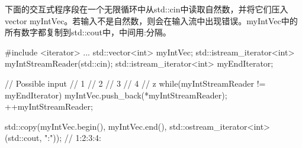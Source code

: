 下面的交互式程序段在一个无限循环中从std::cin中读取自然数，并将它们压入vector myIntVec。若输入不是自然数，则会在输入流中出现错误。myIntVec中的所有数字都复制到std::cout中，中间用:分隔。

\begin{cpp}
#include <iterator>
...
std::vector<int> myIntVec;
std::istream_iterator<int> myIntStreamReader(std::cin);
std::istream_iterator<int> myEndIterator;

// Possible input
// 1
// 2
// 3
// 4
// z
while(myIntStreamReader != myEndIterator){
	myIntVec.push_back(*myIntStreamReader);
	++myIntStreamReader;
}

std::copy(myIntVec.begin(), myIntVec.end(),
			std::ostream_iterator<int>(std::cout, ":"));
			// 1:2:3:4:
\end{cpp}




























